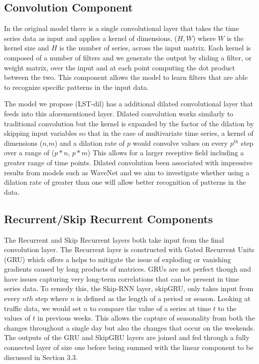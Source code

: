 \documentclass{article}
\begin{document}
\subsection{Convolution Component}
In the original model there is a single convolutional layer that takes the time series data as input and applies a kernel of dimensions, ($H,  W$) where $W$ is the kernel size and $H$ is the number of series, across the input matrix. Each kernel is composed of a number of filters and we generate the output by sliding a filter, or weight matrix, over the input and at each point computing the dot product between the two. This component allows the model to learn filters that are able to recognize specific patterns in the input data.

The model we propose (LST-dil) has a additional dilated convolutional layer that feeds into this aforementioned layer. Dilated convolution works similarly to traditional convolution but the kernel is expanded by the factor of the dilation by skipping input variables so that in the case of multivariate time series, a kernel of dimensions ($n$,$m$)  and a dilation rate of $p$ would convolve values on every $p^{th}$ step over a range of ($p*n$, $p*m$) This allows for a larger receptive field including a greater range of time points. Dilated convolution been associated with impressive results from models such as WaveNet and we aim to investigate whether using a dilation rate of greater than one will allow better recognition of patterns in the data.

\subsection{Recurrent/Skip Recurrent Components}
The Recurrent and Skip Recurrent layers both take input from the final convolution layer. The Recurrent layer is constructed with Gated Recurrent Units (GRU) \cite{chung2014empirical} which offers a helps to mitigate the issue of exploding or vanishing gradients caused by long products of matrices. GRUs are not perfect though and have issues capturing very long-term correlations that can be present in time series data. To remedy this, the Skip-RNN layer, skipGRU, only takes input from every $nth$ step where $n$ is defined as the length of a period or season. Looking at traffic data, we would set $n$ to compare the value of a series at time $t$ to the values of $t$ in previous weeks. This allows the capture of seasonality from both the changes throughout a single day but also the changes that occur on the weekends. The outputs of the GRU and SkipGRU layers are joined and fed through a fully connected layer of size one before being summed with the linear component to be discussed in Section 3.3.
\end{document}
